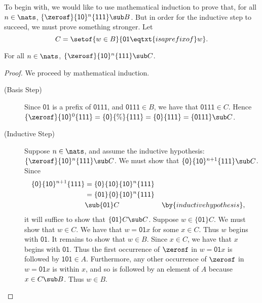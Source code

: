 To begin with, we would like to use mathematical induction to prove
that, for all $n\in\nats$,
$\{\zerosf\}\{\mathsf{10}\}^n\{\mathsf{111}\}\sub B$.  But in order
for the inductive step to succeed, we must prove something stronger.
Let
\begin{displaymath}
C = \setof{w\in B}{\mathsf{01}\eqtxt{is a prefix of}w} .
\end{displaymath}

\begin{lemma}
\label{RegSyn2Lem1}
For all $n\in\nats$, $\{\zerosf\}\{\mathsf{10}\}^n\{\mathsf{111}\}\sub
C$.
\end{lemma}

\begin{proof}
We proceed by mathematical induction.
\begin{description}
\item[\quad(Basis Step)] Since $\mathsf{01}$ is a prefix of $\mathsf{0111}$,
and $\mathsf{0111}\in B$, we have that $\mathsf{0111}\in C$.  Hence
  ${\{\zerosf\}\{\mathsf{10}\}^0\{\mathsf{111}\}} =
  \mathsf{\{0\}\{\%\}\{111\}} = \mathsf{\{0\}\{111\}} =
  \mathsf{\{0111\}}\sub C$.

\item[\quad(Inductive Step)] Suppose $n\in\nats$, and assume the
  inductive hypothesis:
  $\{\zerosf\}\{\mathsf{10}\}^n\{\mathsf{111}\}\sub C$.  We must show
  that ${\{\mathsf{0}\}\{\mathsf{10}\}^{n+1}\{\mathsf{111}\}\sub C}$.
  Since
  \begin{alignat*}{2}
    \{\mathsf{0}\}\{\mathsf{10}\}^{n+1}\{\mathsf{111}\} &=
    \{\mathsf{0}\}\{\mathsf{10}\}\{\mathsf{10}\}^n\{\mathsf{111}\} \\
    &= \{\mathsf{01}\}\{\mathsf{0}\}\{\mathsf{10}\}^n\{\mathsf{111}\} \\
    &\sub \mathsf{\{01\}}C &&\by{inductive hypothesis} ,
  \end{alignat*}
  it will suffice to show that $\mathsf{\{01\}}C\sub C$.  Suppose
  $w\in\mathsf{\{01\}}C$.  We must show that $w\in C$.  We have that
  $w=\mathsf{01}x$ for some $x\in C$.  Thus $w$ begins with
  $\mathsf{01}$.  It remains to show that $w\in B$.  Since $x\in C$,
  we have that $x$ begins with $\mathsf{01}$.  Thus the first
  occurrence of $\zerosf$ in $w=\mathsf{01}x$ is followed by
  $\mathsf{101}\in A$.  Furthermore, any other occurrence of
  $\zerosf$ in $w=\mathsf{01}x$ is within $x$, and so is followed by
  an element of $A$ because $x\in C\sub B$.  Thus $w\in B$.
\end{description}
\end{proof}

